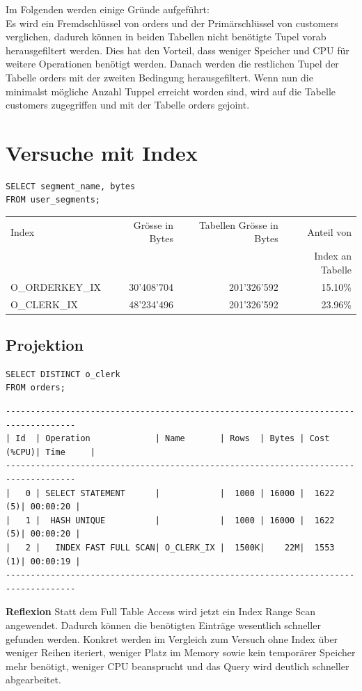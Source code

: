 \documentclass[10pt]{article}
\begin{document}
Im Folgenden werden einige Gründe aufgeführt:\\
Es wird ein Fremdschlüssel von orders und der Primärschlüssel von customers verglichen, 
dadurch können in beiden Tabellen nicht benötigte Tupel vorab herausgefiltert werden.
Dies hat den Vorteil, dass weniger Speicher und CPU für weitere Operationen benötigt werden.
Danach werden die restlichen Tupel der Tabelle orders mit der zweiten Bedingung herausgefiltert.
Wenn nun die minimalst mögliche Anzahl Tuppel erreicht worden sind, wird auf die Tabelle
customers zugegriffen und mit der Tabelle orders gejoint.

\section{Versuche mit Index}
\begin{lstlisting}[style=sql]
SELECT segment_name, bytes
FROM user_segments;
\end{lstlisting}


\begin{tabular}{l||r|r|r}
  Index & Grösse in Bytes & Tabellen Grösse in Bytes & Anteil von \\ 
  & & &  Index an Tabelle \\ \hline
  \hline
  O\_ORDERKEY\_IX & 30'408'704 & 201'326'592 & 15.10\%  \\ \hline
  O\_CLERK\_IX & 48'234'496 & 201'326'592 & 23.96\% \\ 
\end{tabular}

\subsection{Projektion}
\begin{lstlisting}[style=sql]
SELECT DISTINCT o_clerk
FROM orders;
\end{lstlisting}
\begin{lstlisting}[style=queryexecutionplan]
------------------------------------------------------------------------------------
| Id  | Operation             | Name       | Rows  | Bytes | Cost (%CPU)| Time     |
------------------------------------------------------------------------------------
|   0 | SELECT STATEMENT      |            |  1000 | 16000 |  1622   (5)| 00:00:20 |
|   1 |  HASH UNIQUE          |            |  1000 | 16000 |  1622   (5)| 00:00:20 |
|   2 |   INDEX FAST FULL SCAN| O_CLERK_IX |  1500K|    22M|  1553   (1)| 00:00:19 |
------------------------------------------------------------------------------------
\end{lstlisting}
\textbf{Reflexion} \newline
Statt dem Full Table Access wird jetzt ein Index Range Scan angewendet. Dadurch können die benötigten Einträge wesentlich schneller gefunden werden. Konkret werden im Vergleich zum Versuch ohne Index über weniger Reihen iteriert, weniger Platz im Memory sowie kein temporärer Speicher mehr benötigt, weniger CPU beansprucht und das Query wird deutlich schneller abgearbeitet.
\end{document}
